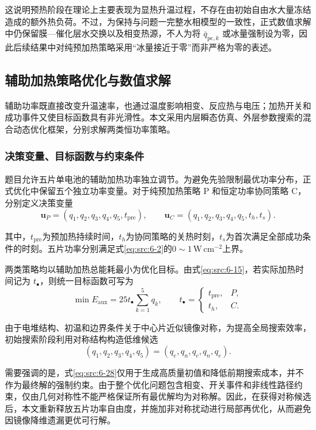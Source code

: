 \documentclass[bwprint]{gmcmthesis}
\numberwithin{equation}{section}
\numberwithin{figure}{section}
\begin{document}
 这说明预热阶段在理论上主要表现为显热升温过程，不存在由初始自由水大量冻结造成的额外热负荷。不过，为保持与问题一完整水相模型的一致性，正式数值求解中仍保留膜—催化层水交换以及相变热源，不人为将 \(\bar{q}_{\text{pc},k}\) 或冰量强制设为零，因此后续结果中对纯预加热策略采用“冰量接近于零”而非严格为零的表述。

\subsection{辅助加热策略优化与数值求解}
辅助功率既直接改变升温速率，也通过温度影响相变、反应热与电压；加热开关和成功事件又使目标函数具有非光滑性。本文采用内层瞬态仿真、外层参数搜索的混合动态优化框架，分别求解两类恒功率策略。

\subsubsection{决策变量、目标函数与约束条件}

 题目允许五片单电池的辅助加热功率独立调节。为避免先验限制最优功率分布，正式优化中保留五个独立功率变量。对于纯预加热策略 P 和恒定功率协同策略 C，分别定义决策变量
\begin{equation}
\boldsymbol{u}_P = (q_1, q_2, q_3, q_4, q_5, t_{\text{pre}}), \qquad \boldsymbol{u}_C = (q_1, q_2, q_3, q_4, q_5, t_h, t_s). \label{eq:src:6-25}
\end{equation}

 其中，$t_{\mathrm{pre}}$为预加热持续时间，$t_h$为协同策略的关热时刻，$t_s$为首次满足全部成功条件的时刻。五片功率分别满足式\eqref{eq:src:6-2}的$0\sim1\,\mathrm{W\,cm^{-2}}$上界。

 两类策略均以辅助加热总能耗最小为优化目标。由式\eqref{eq:src:6-15}，若实际加热时间记为 \(t_\bullet\)，则统一目标函数可写为
\begin{equation}
\min E_{\text{aux}} = 25 t_\bullet \sum_{k=1}^5 q_k, \qquad t_\bullet = \begin{cases} t_{\text{pre}}, & P, \\ t_h, & C. \end{cases} \label{eq:src:6-27}
\end{equation}

 由于电堆结构、初温和边界条件关于中心片近似镜像对称，为提高全局搜索效率，初始搜索阶段利用对称结构构造低维候选
\begin{equation}
(q_1, q_2, q_3, q_4, q_5) = (q_e, q_n, q_c, q_n, q_e). \label{eq:src:6-28}
\end{equation}

 需要强调的是，式\eqref{eq:src:6-28}仅用于生成高质量初值和降低前期搜索成本，并不作为最终解的强制约束。由于整个优化问题包含相变、开关事件和非线性路径约束，仅由几何对称性不能严格保证所有最优解均为对称解。因此，在获得对称候选后，本文重新释放五片功率自由度，并施加非对称扰动进行局部再优化，从而避免因镜像降维遗漏更优可行解。
\end{document}

